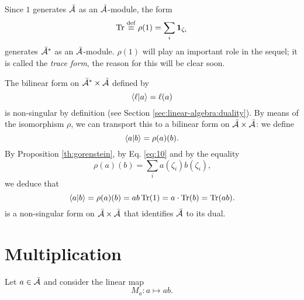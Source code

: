 Since $1$ generates $\bar{\mathcal{A}}$ as an $\bar{\mathcal{A}}$-module, the form
\begin{equation}
  \label{eq:7}
  \operatorname{Tr} \overset{\mathrm{def}}{\equiv} \rho(1) = \sum_i\mathbf{1}_{\zeta_i}
\end{equation}
generates $\bar{\mathcal{A}}^\ast$ as an $\bar{\mathcal{A}}$-module.
$\rho(1)$ will play an important role in the sequel; it is called the
\emph{trace form}, the reason for this will be clear soon.

The bilinear form on $\bar{\mathcal{A}}^\ast\times\bar{\mathcal{A}}$
defined by
\begin{equation}
  \label{eq:11}
  \left\langle \ell \middle| a \right\rangle = \ell(a)
\end{equation}
is non-singular by definition (see Section
\ref{sec:linear-algebra:duality}). By means of the isomorphism $\rho$,
we can transport this to a bilinear form on
$\bar{\mathcal{A}}\times\bar{\mathcal{A}}$: we define
\begin{equation}
  \label{eq:15}
  \left\langle a \middle| b \right\rangle=\rho(a)(b)
  \text{.}
\end{equation}
By Proposition \ref{th:gorenstein}, by Eq. \eqref{eq:10} and by the
equality
\begin{equation}
  \label{eq:16}
  \rho(a)(b) = \sum_i a(\zeta_i)b(\zeta_i)
  \text{,}
\end{equation}
we deduce that
\begin{equation}
  \label{eq:17}
  \left\langle a \middle| b \right\rangle = \rho(a)(b) = ab\operatorname{Tr}(1) = a\cdot\operatorname{Tr}(b) = \operatorname{Tr}(ab)
  \text{.}
\end{equation}
is a non-singular form on $\bar{\mathcal{A}}\times\bar{\mathcal{A}}$
that identifies $\bar{\mathcal{A}}$ to its dual.

\section{Multiplication}
\label{sec:multiplication}

Let $a\in\bar{\mathcal{A}}$ and consider the linear map
\begin{equation}
  \label{eq:18}
  M_a:a \mapsto ab
  \text{.}
\end{equation}

